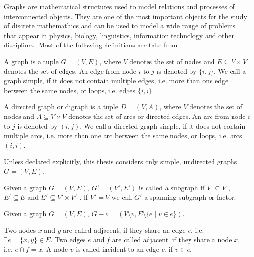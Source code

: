 Graphs are mathematical structures used to model relations and processes of interconnected objects. They are one of the most important objects for the study of discrete mathemathics and can be used to model a wide range of problems that appear in physics, biology, linguistics, information technology and other disciplines. Most of the following definitions are take from \cite{fritz-11}.

\begin{definition}[Graph]
A graph is a tuple $G = (V, E)$, where $V$ denotes the set of nodes and $E \subseteq V \times V$ denotes the set of edges. An edge from node $i$ to $j$ is denoted by $\{i, j\}$. We call a graph simple, if it does not contain multiple edges, i.e. more than one edge between the same nodes, or loops, i.e. edges $\{i, i\}$.
\end{definition}

\begin{definition}
A directed graph or digraph is a tuple $D = (V, A)$, where $V$ denotes the set of nodes and $A \subseteq V \times V$ denotes the set of arcs
or directed edges. An arc from node $i$ to $j$ is denoted by $(i, j)$. We call a directed graph simple, if it does not contain multiple arcs, i.e. more than one arc between the same nodes, or loops, i.e. arcs $(i, i)$.
\end{definition}

Unless declared explicitly, this thesis considers only simple, undirected graphs $G = (V, E)$.

\begin{definition}[Subgraph]
Given a graph $G = (V, E)$, $G' = (V', E')$ is called a subgraph if $V' \subseteq V$ , $E' \subseteq E$ and $E' \subseteq V' \times V'$ . If  $V' = V$ we call $G'$ a spanning subgraph or factor.
\end{definition}

\begin{definition}
Given a graph $G = (V, E)$, $G - v = (V \setminus v, E \setminus \{e \mid v \in e\})$.
\end{definition}

\begin{definition}
Two nodes $x$ and $y$ are called adjacent, if they share an edge $e$, i.e. $\exists e = \{x, y\} \in E$. Two edges $e$ and $f$ are called adjacent, if they share a node $x$, i.e. $e \cap f = x$. A node $v$ is called incident to an edge $e$, if $v \in e$.
\end{definition}


